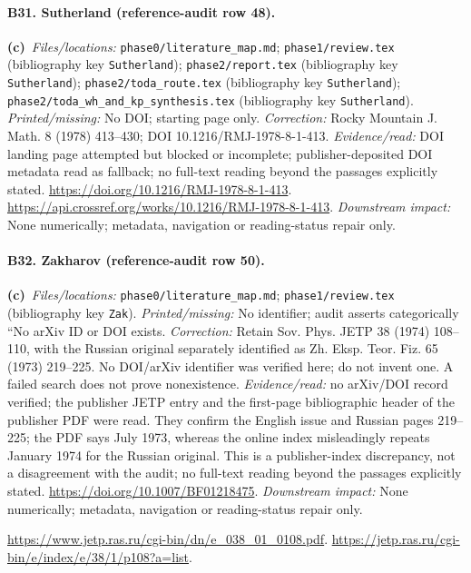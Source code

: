 \documentclass[11pt,a4paper]{article}
\newcommand{\C}{\textbf{(c)}\ }
\newcommand{\file}[1]{\nolinkurl{#1}}
\begin{document}
\paragraph{B31. Sutherland (reference-audit row 48).}
\C \textit{Files/locations:} \file{phase0/literature_map.md}; \file{phase1/review.tex} (bibliography key \file{Sutherland}); \file{phase2/report.tex} (bibliography key \file{Sutherland}); \file{phase2/toda_route.tex} (bibliography key \file{Sutherland}); \file{phase2/toda_wh_and_kp_synthesis.tex} (bibliography key \file{Sutherland}).
\textit{Printed/missing:} No DOI; starting page only.
\textit{Correction:} Rocky Mountain J. Math. 8 (1978) 413--430; DOI 10.1216/RMJ-1978-8-1-413.
\textit{Evidence/read:} DOI landing page attempted but blocked or incomplete; publisher-deposited DOI metadata read as fallback; no full-text reading beyond the passages explicitly stated.
\url{https://doi.org/10.1216/RMJ-1978-8-1-413}.
\url{https://api.crossref.org/works/10.1216/RMJ-1978-8-1-413}.
\textit{Downstream impact:} None numerically; metadata, navigation or reading-status repair only.
\paragraph{B32. Zakharov (reference-audit row 50).}
\C \textit{Files/locations:} \file{phase0/literature_map.md}; \file{phase1/review.tex} (bibliography key \file{Zak}).
\textit{Printed/missing:} No identifier; audit asserts categorically ``No arXiv ID or DOI exists.
\textit{Correction:} Retain Sov. Phys. JETP 38 (1974) 108--110, with the Russian original separately identified as Zh. Eksp. Teor. Fiz. 65 (1973) 219--225. No DOI/arXiv identifier was verified here; do not invent one. A failed search does not prove nonexistence.
\textit{Evidence/read:} no arXiv/DOI record verified; the publisher JETP entry and the first-page bibliographic header of the publisher PDF were read. They confirm the English issue and Russian pages 219--225; the PDF says July 1973, whereas the online index misleadingly repeats January 1974 for the Russian original. This is a publisher-index discrepancy, not a disagreement with the audit; no full-text reading beyond the passages explicitly stated.
\url{https://doi.org/10.1007/BF01218475}.
\textit{Downstream impact:} None numerically; metadata, navigation or reading-status repair only.

\url{https://www.jetp.ras.ru/cgi-bin/dn/e_038_01_0108.pdf}.
\url{https://jetp.ras.ru/cgi-bin/e/index/e/38/1/p108?a=list}.
\end{document}
